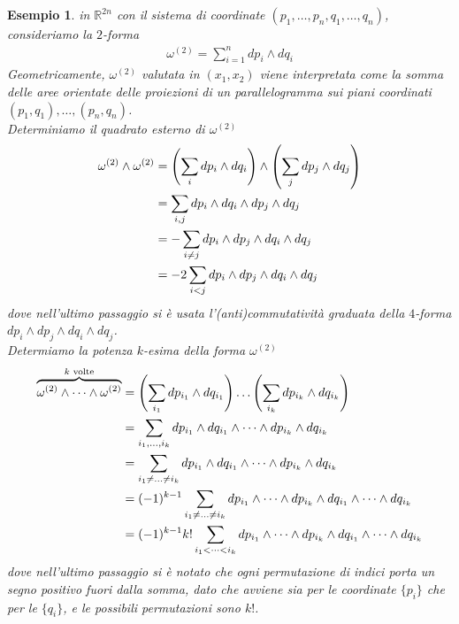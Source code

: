 \documentclass[twoside, 11pt]{amsbook}
\newcommand{\0}{{(0)}}
\newcommand{\3}{{(3)}}
\theoremstyle{colonplain}
\theoremstyle{colondefinition}
\newtheorem{ex}[thm]{Esempio}
\theoremstyle{colonremark}
\numberwithin{equation}{chapter}
\begin{document}
\begin{ex} in $\mathbb{R}^{2n}$ con il sistema di coordinate $(p_1, \dots, p_n, q_1, \dots, q_n)$, consideriamo la $2$-forma 
\begin{align}
    \omega^{(2)} = \sum_{i = 1}^n dp_i \wedge dq_i 
\end{align}
Geometricamente, $\omega^{(2)}$ valutata in $(x_1, x_2)$ viene interpretata come la somma delle aree orientate delle proiezioni di un parallelogramma sui piani coordinati $(p_1, q_1), \dots, (p_n, q_n)$. \\
Determiniamo il quadrato esterno di $\omega^{(2)}$
\begin{align}
    \omega^{(2)} \wedge \omega^{(2)} &= \left(\sum_i dp_i \wedge dq_i\right) \wedge \left(\sum_j dp_j \wedge dq_j\right) \notag \\
    &= \sum_{i, j}dp_i \wedge dq_i \wedge dp_j \wedge dq_j \notag \\
    &= -\sum_{i \neq j} dp_i \wedge dp_j \wedge dq_i \wedge dq_j \notag \\
    &= -2\sum_{i < j} dp_i \wedge dp_j \wedge dq_i \wedge dq_j 
\end{align}
dove nell'ultimo passaggio si è usata l'(anti)commutatività graduata della $4$-forma $dp_i \wedge dp_j \wedge dq_i \wedge dq_j$. \\
Determiamo la potenza $k$-esima della forma $\omega^{(2)}$
\begin{align}
    \overbrace{\omega^{(2)} \wedge \dots \wedge \omega^{(2)}}^{k \text{ volte}} &= \left(\sum_{i_1}dp_{i_1} \wedge dq_{i_1}\right) \dots \left(\sum_{i_k}dp_{i_k} \wedge dq_{i_k}\right) \notag \\
    &= \sum_{i_1, \dots, i_k} dp_{i_1} \wedge dq_{i_1} \wedge \dots \wedge dp_{i_k} \wedge dq_{i_k} \notag \\
    &= \sum_{i_1 \neq \dots \neq i_k} dp_{i_1} \wedge dq_{i_1} \wedge \dots \wedge dp_{i_k} \wedge dq_{i_k} \notag \\
    &= (-1)^{k - 1}\sum_{i_1 \neq \dots \neq i_k} dp_{i_1} \wedge \dots \wedge dp_{i_k} \wedge dq_{i_1} \wedge \dots \wedge dq_{i_k} \notag \\
    &= (-1)^{k - 1}k!\sum_{i_1 < \dots < i_k} dp_{i_1} \wedge \dots \wedge dp_{i_k} \wedge dq_{i_1} \wedge \dots \wedge dq_{i_k}
\end{align}
dove nell'ultimo passaggio si è notato che ogni permutazione di indici porta un segno positivo fuori dalla somma, dato che avviene sia per le coordinate $\{p_i\}$ che per le $\{q_i\}$, e le possibili permutazioni sono $k!$.
\end{ex}
\end{document}
